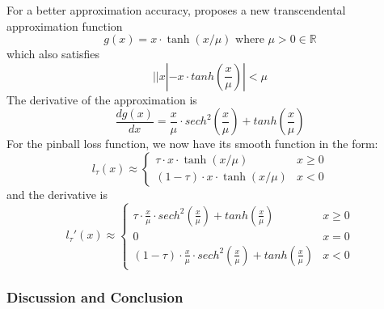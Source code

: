 For a better approximation accuracy, \citeauthor{bagulSMOOTHTRANSCENDENTALAPPROXIMATION2017}\cite{bagulSMOOTHTRANSCENDENTALAPPROXIMATION2017} proposes a new transcendental approximation function 
 \begin{equation}
    g(x) = x \cdot \tanh(x/\mu) \text{  where } \mu > 0 \in \mathbb{R}
 \end{equation}
which also satisfies
\begin{equation}
    ||x| - x \cdot tanh(\frac{x}{\mu})| < \mu
\end{equation}
The derivative of the approximation is
\begin{equation}
    \frac{dg(x)}{dx} = \frac{x}{\mu} \cdot sech^2 (\frac{x}{\mu}) + tanh(\frac{x}{\mu})
\end{equation}
For the pinball loss function, we now have its smooth function in the form:
\begin{equation}
    l_\tau(x) \approx 
    \begin{cases}
        \tau \cdot x \cdot \tanh(x/\mu) & {x\geq 0}\\
        (1-\tau) \cdot x \cdot \tanh(x/\mu) & {x < 0}
    \end{cases}
\end{equation}
and the derivative is
\begin{equation}
\label{eq:smooth_new_d}
    l_\tau\prime(x) \approx 
    \begin{cases}
        \tau \cdot \frac{x}{\mu} \cdot sech^2 (\frac{x}{\mu}) + tanh(\frac{x}{\mu}) & {x\geq 0}\\
        0 & {x=0}\\
        (1-\tau) \cdot \frac{x}{\mu} \cdot sech^2 (\frac{x}{\mu}) + tanh(\frac{x}{\mu}) & {x < 0}
    \end{cases}
\end{equation}
\subsubsection{Discussion and Conclusion}

